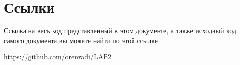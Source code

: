 \section{Ссылки}
Ссылка на весь код представленный в этом документе, а также исходный код самого документа вы можете найти по этой ссылке

\href{https://github.com/orenvadi/LAB2}{https://github.com/orenvadi/LAB2}

















% 




